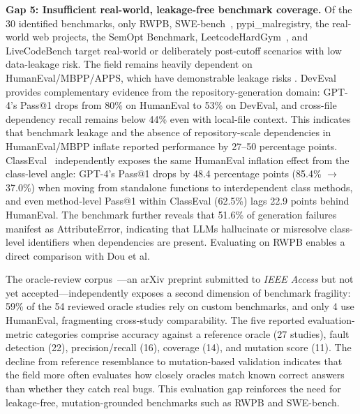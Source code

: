 \documentclass[10pt,a4paper]{article}
\begin{document}
\textbf{Gap 5: Insufficient real-world, leakage-free benchmark coverage.} Of the 30 identified benchmarks, only RWPB, SWE-bench~\cite{jimenez2024swebench}, pypi\_malregistry, the real-world web projects, the SemOpt Benchmark, LeetcodeHardGym~\cite{shinn2023}, and LiveCodeBench target real-world or deliberately post-cutoff scenarios with low data-leakage risk. The field remains heavily dependent on HumanEval/MBPP/APPS, which have demonstrable leakage risks \cite{dou2026}. DevEval~\cite{li2024deveval} provides complementary evidence from the repository-generation domain: GPT-4's Pass@1 drops from 80\% on HumanEval to 53\% on DevEval, and cross-file dependency recall remains below 44\% even with local-file context. This indicates that benchmark leakage and the absence of repository-scale dependencies in HumanEval/MBPP inflate reported performance by 27--50 percentage points. ClassEval~\cite{du2023classeval} independently exposes the same HumanEval inflation effect from the class-level angle: GPT-4's Pass@1 drops by 48.4 percentage points (85.4\% $\rightarrow$ 37.0\%) when moving from standalone functions to interdependent class methods, and even method-level Pass@1 within ClassEval (62.5\%) lags 22.9 points behind HumanEval. The benchmark further reveals that 51.6\% of generation failures manifest as AttributeError, indicating that LLMs hallucinate or misresolve class-level identifiers when dependencies are present. Evaluating on RWPB enables a direct comparison with Dou et al.

The oracle-review corpus~\cite{mughal2026oracle}---an arXiv preprint submitted to \textit{IEEE Access} but not yet accepted---independently exposes a second dimension of benchmark fragility: 59\% of the 54 reviewed oracle studies rely on custom benchmarks, and only 4 use HumanEval, fragmenting cross-study comparability. The five reported evaluation-metric categories comprise accuracy against a reference oracle (27 studies), fault detection (22), precision/recall (16), coverage (14), and mutation score (11). The decline from reference resemblance to mutation-based validation indicates that the field more often evaluates how closely oracles match known correct answers than whether they catch real bugs. This evaluation gap reinforces the need for leakage-free, mutation-grounded benchmarks such as RWPB and SWE-bench.
\end{document}
